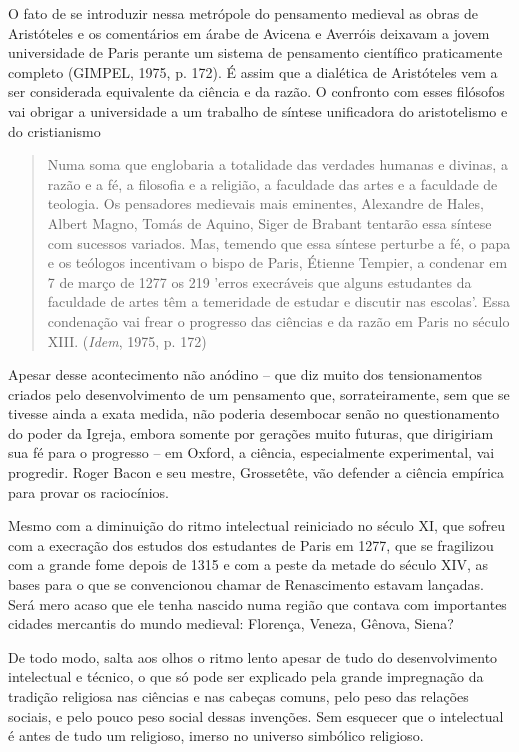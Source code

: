 O fato de se introduzir nessa metrópole do pensamento medieval as obras
de Aristóteles e os comentários em árabe de Avicena e Averróis deixavam
a jovem universidade de Paris perante um sistema de pensamento
científico praticamente completo (GIMPEL, 1975, p. 172). É assim que a
dialética de Aristóteles vem a ser considerada equivalente da ciência e
da razão. O confronto com esses filósofos vai obrigar a universidade a
um trabalho de síntese unificadora do aristotelismo e do cristianismo

\begin{quote}
Numa soma que englobaria a totalidade das verdades humanas e divinas, a
razão e a fé, a filosofia e a religião, a faculdade das artes e a
faculdade de teologia. Os pensadores medievais mais eminentes, Alexandre
de Hales, Albert Magno, Tomás de Aquino, Siger de Brabant tentarão essa
síntese com sucessos variados. Mas, temendo que essa síntese perturbe a
fé, o papa e os teólogos incentivam o bispo de Paris, Étienne Tempier, a
condenar em 7 de março de 1277 os 219 'erros execráveis que alguns
estudantes da faculdade de artes têm a temeridade de estudar e discutir
nas escolas'. Essa condenação vai frear o progresso das ciências e da
razão em Paris no século XIII. (\emph{Idem}, 1975, p. 172)
\end{quote}

Apesar desse acontecimento não anódino -- que diz muito dos
tensionamentos criados pelo desenvolvimento de um pensamento que,
sorrateiramente, sem que se tivesse ainda a exata medida, não poderia
desembocar senão no questionamento do poder da Igreja, embora somente
por gerações muito futuras, que dirigiriam sua fé para o progresso -- em
Oxford, a ciência, especialmente experimental, vai progredir. Roger
Bacon e seu mestre, Grossetête, vão defender a ciência empírica para
provar os raciocínios.

Mesmo com a diminuição do ritmo intelectual reiniciado no século XI, que
sofreu com a execração dos estudos dos estudantes de Paris em 1277, que
se fragilizou com a grande fome depois de 1315 e com a peste da metade
do século XIV, as bases para o que se convencionou chamar de
Renascimento estavam lançadas. Será mero acaso que ele tenha nascido
numa região que contava com importantes cidades mercantis do mundo
medieval: Florença, Veneza, Gênova, Siena?

De todo modo, salta aos olhos o ritmo lento apesar de tudo do
desenvolvimento intelectual e técnico, o que só pode ser explicado pela
grande impregnação da tradição religiosa nas ciências e nas cabeças
comuns, pelo peso das relações sociais, e pelo pouco peso social dessas
invenções. Sem esquecer que o intelectual é antes de tudo um religioso,
imerso no universo simbólico religioso.

